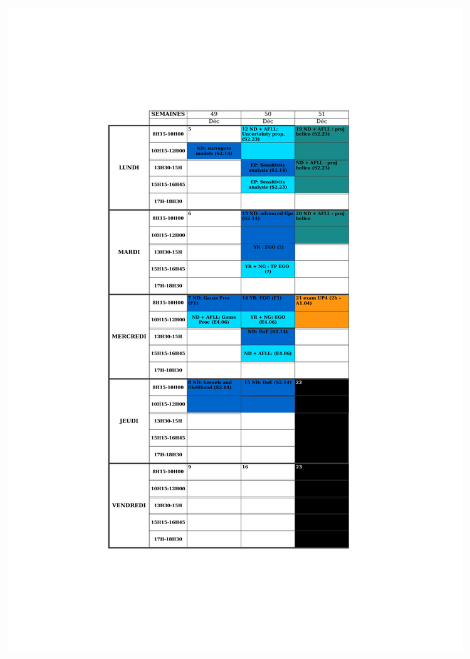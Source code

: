 \documentclass{beamer}
\begin{document}
\begin{frame}{}
\centering
\vspace{-2.5cm}\includegraphics[height=17cm]{figures/EDT_DataScience_UP4_2016.pdf}
\end{frame}
\end{document}
